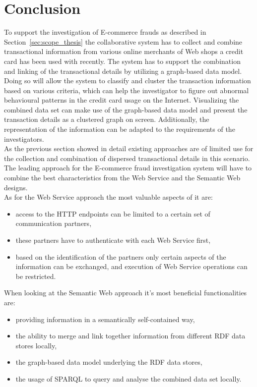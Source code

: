 
\section{Conclusion}
\label{sec:concept_conclusion}

To support the investigation of \gls{E-commerce} frauds as described in Section~\ref{sec:scope_thesis} the collaborative system has to collect and combine transactional information from various online merchants of Web shops a credit card has been used with recently. The system has to support the combination and linking of the transactional details by utilizing a graph-based data model. Doing so will allow the system to classify and cluster the transaction information based on various criteria, which can help the investigator to figure out abnormal behavioural patterns in the credit card usage on the Internet. Visualizing the combined data set can make use of the graph-based data model and present the transaction details as a clustered graph on screen. Additionally, the representation of the information can be adapted to the requirements of the investigators. \\

As the previous section showed in detail existing approaches are of limited use for the collection and combination of dispersed transactional details in this scenario. The leading approach for the \gls{E-commerce} fraud investigation system will have to combine the best characteristics from the Web Service and the Semantic Web designs. \\

As for the Web Service approach the most valuable aspects of it are: \@

\begin{itemize}
	\item access to the \gls{HTTP} endpoints can be limited to a certain set of communication partners,
	\item these partners have to authenticate with each Web Service first,
	\item based on the identification of the partners only certain aspects of the information can be exchanged, and execution of Web Service operations can be restricted.
\end{itemize}

When looking at the Semantic Web approach it's most beneficial functionalities are: \@

\begin{itemize}
	\item providing information in a semantically self-contained way,
	\item the ability to merge and link together information from different \gls{RDF} data stores locally,
	\item the graph-based data model underlying the \gls{RDF} data stores,
	\item the usage of \gls{SPARQL} to query and analyse the combined data set locally.
\end{itemize}

